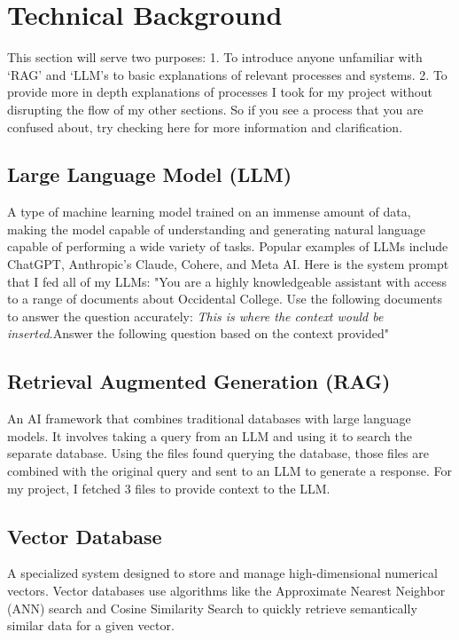 \documentclass[10pt,twocolumn]{article}
\begin{document}
\section{Technical Background}
This section will serve two purposes: 1. To introduce anyone unfamiliar with ‘RAG’ and ‘LLM’s to basic explanations of relevant processes and systems. 2. To provide more in depth explanations of processes I took for my project without disrupting the flow of my other sections. So if you see a process that you are confused about, try checking here for more information and clarification.

\subsection{Large Language Model (LLM)\cite{IBM_LLM}}A type of machine learning model trained on an immense amount of data, making the model capable of understanding and generating natural language capable of performing a wide variety of tasks. Popular examples of LLMs include ChatGPT, Anthropic’s Claude, Cohere, and Meta AI. Here is the system prompt that I fed all of my LLMs:  "You are a highly knowledgeable assistant with access to a range of documents about Occidental College. Use the following documents to answer the question accurately: \emph{This is where the context would be inserted}.Answer the following question based on the context provided"

\vspace{10pt}

\subsection{Retrieval Augmented Generation (RAG) \cite{Google_RAG}} An AI framework that combines traditional databases with large language models. It involves taking a query from an LLM and using it to search the separate database. Using the files found querying the database, those files are combined with the original query and sent to an LLM to generate a response. For my project, I fetched 3 files to provide context to the LLM. 
\vspace{10pt}
\subsection{Vector Database \cite{pinecone2024}} A specialized system designed to store and manage high-dimensional numerical vectors. Vector databases use algorithms like the Approximate Nearest Neighbor (ANN) search and Cosine Similarity Search to quickly retrieve semantically similar data for a given vector. 
\vspace{60pt}
\end{document}
